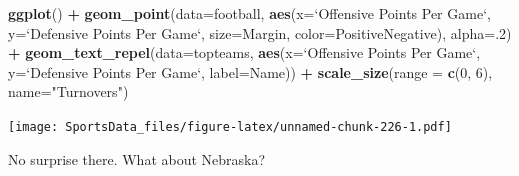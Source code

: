 \documentclass[
]{book}
\newenvironment{Shaded}{\begin{snugshade}}{\end{snugshade}}
\newcommand{\DataTypeTok}[1]{\textcolor[rgb]{0.13,0.29,0.53}{#1}}
\newcommand{\DecValTok}[1]{\textcolor[rgb]{0.00,0.00,0.81}{#1}}
\newcommand{\KeywordTok}[1]{\textcolor[rgb]{0.13,0.29,0.53}{\textbf{#1}}}
\newcommand{\NormalTok}[1]{#1}
\newcommand{\OperatorTok}[1]{\textcolor[rgb]{0.81,0.36,0.00}{\textbf{#1}}}
\newcommand{\StringTok}[1]{\textcolor[rgb]{0.31,0.60,0.02}{#1}}
\begin{document}
\begin{Shaded}
\begin{Highlighting}[]
\KeywordTok{ggplot}\NormalTok{() }\OperatorTok{+}
\StringTok{  }\KeywordTok{geom_point}\NormalTok{(}\DataTypeTok{data=}\NormalTok{football, }\KeywordTok{aes}\NormalTok{(}\DataTypeTok{x=}\StringTok{`}\DataTypeTok{Offensive Points Per Game}\StringTok{`}\NormalTok{, }\DataTypeTok{y=}\StringTok{`}\DataTypeTok{Defensive Points Per Game}\StringTok{`}\NormalTok{, }\DataTypeTok{size=}\NormalTok{Margin, }\DataTypeTok{color=}\NormalTok{PositiveNegative), }\DataTypeTok{alpha=}\NormalTok{.}\DecValTok{2}\NormalTok{) }\OperatorTok{+}
\StringTok{  }\KeywordTok{geom_text_repel}\NormalTok{(}\DataTypeTok{data=}\NormalTok{topteams, }\KeywordTok{aes}\NormalTok{(}\DataTypeTok{x=}\StringTok{`}\DataTypeTok{Offensive Points Per Game}\StringTok{`}\NormalTok{, }\DataTypeTok{y=}\StringTok{`}\DataTypeTok{Defensive Points Per Game}\StringTok{`}\NormalTok{, }\DataTypeTok{label=}\NormalTok{Name)) }\OperatorTok{+}\StringTok{ }
\StringTok{  }\KeywordTok{scale_size}\NormalTok{(}\DataTypeTok{range =} \KeywordTok{c}\NormalTok{(}\DecValTok{0}\NormalTok{, }\DecValTok{6}\NormalTok{), }\DataTypeTok{name=}\StringTok{"Turnovers"}\NormalTok{)}
\end{Highlighting}
\end{Shaded}

\texttt{[image: SportsData\_files/figure-latex/unnamed-chunk-226-1.pdf]}

No surprise there. What about Nebraska?

\begin{Shaded}
\end{Shaded}
\end{document}
